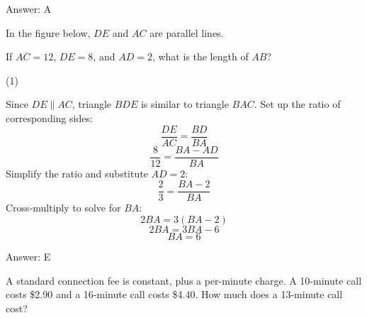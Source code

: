 \documentclass[11pt,paper=a4,answers]{exam}
\begin{document}
\begin{questions}
\begin{solution}
Answer: \colorbox{yellow!100}{A}
\end{solution}

\vspace{1cm}


\question
In the figure below, $DE$ and $AC$ are parallel lines.
\begin{center}
\end{center}
If $AC = 12$, $DE = 8$, and $AD = 2$, what is the length of $AB$?

\begin{tasks}(1)
    
\end{tasks}

\begin{solution}
Since $DE \parallel AC$, triangle $BDE$ is similar to triangle $BAC$.
\vspace{5pt}
Set up the ratio of corresponding sides:
\vspace{5pt}
\[ \dfrac{DE}{AC} = \dfrac{BD}{BA} \]
\vspace{5pt}
\[ \dfrac{8}{12} = \dfrac{BA - AD}{BA} \]
\vspace{5pt}
Simplify the ratio and substitute $AD = 2$:
\vspace{5pt}
\[ \dfrac{2}{3} = \dfrac{BA - 2}{BA} \]
\vspace{5pt}
Cross-multiply to solve for $BA$:
\vspace{5pt}
\[ 2BA = 3(BA - 2) \]
\vspace{5pt}
\[ 2BA = 3BA - 6 \]
\vspace{5pt}
\[ BA = 6 \]

Answer: \colorbox{yellow!100}{E}
\end{solution}

\vspace{1cm}

\question
A standard connection fee is constant, plus a per-minute charge. A 10-minute call costs \$2.90 and a 16-minute call costs \$4.40. How much does a 13-minute call cost?


\end{questions}
\end{document}

